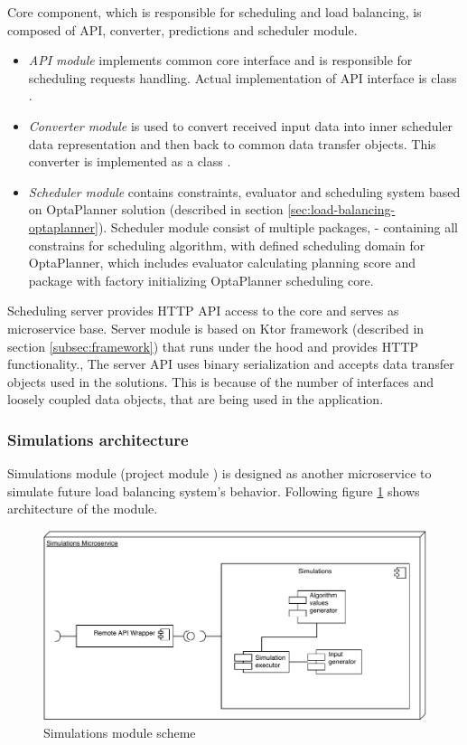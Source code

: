 Core component, 
which is responsible for scheduling and load balancing,
is composed of API, converter, predictions and scheduler module.
\begin{itemize}
    \item \textit{API module} implements common core interface  
    and is responsible for scheduling requests handling.
    Actual implementation of API interface is class .
    \item \textit{Converter module} is used to convert received input data into inner scheduler data representation 
    and then back to common data transfer objects. 
    This converter is implemented as a class .
    \item \textit{Scheduler module} contains constraints, evaluator and scheduling system based on OptaPlanner solution
    (described in section \ref{sec:load-balancing-optaplanner}).
    Scheduler module consist of multiple packages, 
     - containing all constrains for scheduling algorithm,
     with defined scheduling domain for OptaPlanner,
     which includes evaluator calculating planning score
    and  package with factory initializing OptaPlanner scheduling core.
\end{itemize}

Scheduling server provides HTTP API access to the core
and serves as microservice base.
Server module is based on Ktor framework (described in section \ref{subsec:framework})
that runs under the hood and provides HTTP functionality.,
The server API uses binary serialization and accepts data transfer objects used in the solutions.
This is because of the number of interfaces and loosely coupled data objects,
that are being used in the application.

\subsubsection{Simulations architecture}\label{subsec:simulations-architecture}
Simulations module (project module ) is designed as another microservice to simulate future load balancing system's behavior.
Following figure \ref{fig:simulations-arch} shows architecture of the module.  

\begin{figure}[ht]
    \includegraphics[width=\textwidth]{i_simulations.pdf}
    \centering
    \caption{Simulations module scheme}
    \label{fig:simulations-arch}
\end{figure}


